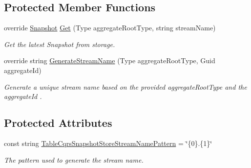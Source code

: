 \subsection*{Protected Member Functions}
\begin{DoxyCompactItemize}
\item 
override \hyperlink{classCqrs_1_1Snapshots_1_1Snapshot}{Snapshot} \hyperlink{classCqrs_1_1Azure_1_1BlobStorage_1_1Events_1_1TableStorageSnapshotStore_a169361a7fbf413fed660609f66d95e13_a169361a7fbf413fed660609f66d95e13}{Get} (Type aggregate\+Root\+Type, string stream\+Name)
\begin{DoxyCompactList}\small\item\em Get the latest Snapshot from storage. \end{DoxyCompactList}\item 
override string \hyperlink{classCqrs_1_1Azure_1_1BlobStorage_1_1Events_1_1TableStorageSnapshotStore_a95503a8721d083d070495cb4f884c0cf_a95503a8721d083d070495cb4f884c0cf}{Generate\+Stream\+Name} (Type aggregate\+Root\+Type, Guid aggregate\+Id)
\begin{DoxyCompactList}\small\item\em Generate a unique stream name based on the provided {\itshape aggregate\+Root\+Type}  and the {\itshape aggregate\+Id} . \end{DoxyCompactList}\end{DoxyCompactItemize}
\subsection*{Protected Attributes}
\begin{DoxyCompactItemize}
\item 
const string \hyperlink{classCqrs_1_1Azure_1_1BlobStorage_1_1Events_1_1TableStorageSnapshotStore_a003aef39dbb3bb1a1ad717c7739503ea_a003aef39dbb3bb1a1ad717c7739503ea}{Table\+Cqrs\+Snapshot\+Store\+Stream\+Name\+Pattern} = \char`\"{}\{0\}.\{1\}\char`\"{}
\begin{DoxyCompactList}\small\item\em The pattern used to generate the stream name. \end{DoxyCompactList}\end{DoxyCompactItemize}
